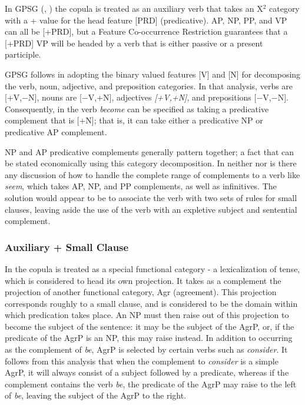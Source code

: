 In GPSG (\cite{gazdar85}, \cite{sag85}) the copula is treated as an auxiliary
verb that takes an X$^{2}$ category with a + value for the head feature
[PRD] (predicative). AP, NP, PP, and VP can all be [+PRD], but a
Feature Co-occurrence Restriction guarantees that a [+PRD] VP will be
headed by a verb that is either passive or a present participle.

GPSG follows \cite{chomsky70} in adopting the binary valued features [V] and
[N] for decomposing the verb, noun, adjective, and preposition categories.  In
that analysis, verbs are [+V,$-$N], nouns are [$-$V,+N], adjectives {\it
[+V,+N]}, and prepositions [$-$V,$-$N].  Consequently, in \cite{sag85} the
verb {\it become} can be specified as taking a predicative complement that is
[+N]; that is, it can take either a predicative NP or predicative AP
complement.


NP and AP predicative complements generally pattern together; a fact that can
be stated economically using this category decomposition.  In neither
\cite{sag85} nor \cite{chomsky70} is there any discussion of how to handle 
the complete range of complements to a verb like {\it seem}, which takes AP,
NP, and PP complements, as well as infinitives.  The solution would appear
to be to associate the verb with two sets of rules for small clauses, leaving
aside the use of the verb with an expletive subject and sentential complement.

\subsubsection{Auxiliary + Small Clause}

\label{mo}
In \cite{moro90} the copula is treated as a special functional category - a
lexicalization of tense, which is considered to head its own projection. It
takes as a complement the projection of another functional category, Agr
(agreement). This projection corresponds roughly to a small clause, and is
considered to be the domain within which predication takes place.  An NP must
then raise out of this projection to become the subject of the sentence: it may
be the subject of the AgrP, or, if the predicate of the AgrP is an NP, this may
raise instead.  In addition to occurring as the complement of {\it be}, AgrP is
selected by certain verbs such as {\it consider}. It follows from this analysis
that when the complement to {\it consider} is a simple AgrP, it will always
consist of a subject followed by a predicate, whereas if the complement
contains the verb {\it be}, the predicate of the AgrP may raise to the left of
{\it be}, leaving the subject of the AgrP to the right.

